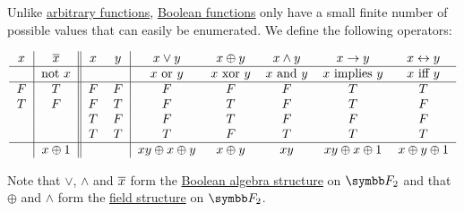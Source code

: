 \begin{definition}\label{def:standard_boolean_operators}
  Unlike \hyperref[def:function/single_valued]{arbitrary functions}, \hyperref[def:boolean_function]{Boolean functions} only have a small finite number of possible values that can easily be enumerated. We define the following operators:

  \begin{equation*}
    \begin{tabular}{c | c || c c | c c c c c c}
      \( x \) & \( \Ol{x} \)     & \( x \) & \( y \) & \( x \vee y \)             & \( x \oplus y \)    & \( x \wedge y \)    & \( x \rightarrow y \)      & \( x \leftrightarrow y \) \\
      \hline
              & not \( x \)      &         &         & \( x \) or \( y \)         & \( x \) xor \( y \) & \( x \) and \( y \) & \( x \) implies \( y \)    & \( x \) iff \( y \)       \\
      \hline
      \( F \) & \( T \)          & \( F \) & \( F \) & \( F \)                    & \( F \)             & \( F \)             & \( T \)                    & \( T \)                   \\
      \( T \) & \( F \)          & \( F \) & \( T \) & \( F \)                    & \( T \)             & \( F \)             & \( T \)                    & \( F \)                   \\
              &                  & \( T \) & \( F \) & \( F \)                    & \( T \)             & \( F \)             & \( F \)                    & \( F \)                   \\
              &                  & \( T \) & \( T \) & \( T \)                    & \( F \)             & \( T \)             & \( T \)                    & \( T \)                   \\
      \hline
              & \( x \oplus 1 \) &         &         & \( xy \oplus x \oplus y \) & \( x \oplus y \)    & \( xy \)            & \( xy \oplus x \oplus 1 \) & \( x \oplus y \oplus 1 \)
    \end{tabular}
  \end{equation*}

  Note that \( \vee \), \( \wedge \) and \( \overline{x} \) form the \hyperref[thm:f2_is_boolean_algebra]{Boolean algebra structure} on \( \BF_2 \) and that \( \oplus \) and \( \wedge \) form the \hyperref[def:field]{field structure} on \( \BF_2 \).
\end{definition}

